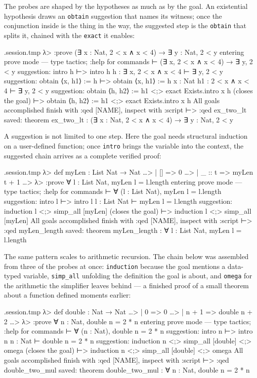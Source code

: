 \documentclass[11pt,oneside]{article}
\newcommand{\code}[1]{\texttt{#1}}
\newenvironment{session}
 {\VerbatimEnvironment\begin{VerbatimOut}{\jobname.session.tmp}}
 {\end{VerbatimOut}%
  \begin{sessionouter}%
  \VerbatimInput[fontsize=\footnotesize, breaklines=true,
    breaksymbolleft={\textcolor{stone}{\footnotesize$\hookrightarrow$}},
    formatcom=\color{ink}, tabsize=4]{\jobname.session.tmp}%
  \end{sessionouter}}
\begin{document}
The probes are shaped by the hypotheses as much as by the goal.  An
existential hypothesis draws an \code{obtain} suggestion that names
its witness; once the conjunction inside is the thing in the way, the
suggested step is the \code{obtain} that splits it, chained with the
\code{exact} it enables:

\begin{session}
λ> :prove (∃ x : Nat, 2 < x ∧ x < 4) → ∃ y : Nat, 2 < y
entering prove mode — type tactics; :help for commands
⊢ (∃ x, 2 < x ∧ x < 4) → ∃ y, 2 < y
suggestion: intro h
⊢> intro h
h : ∃ x, 2 < x ∧ x < 4
⊢ ∃ y, 2 < y
suggestion: obtain ⟨x, h1⟩ := h
⊢> obtain ⟨x, h1⟩ := h
x : Nat
h1 : 2 < x ∧ x < 4
⊢ ∃ y, 2 < y
suggestion: obtain ⟨h, h2⟩ := h1 <;> exact Exists.intro x h  (closes the goal)
⊢> obtain ⟨h, h2⟩ := h1 <;> exact Exists.intro x h
All goals accomplished
finish with :qed [NAME], inspect with :script
⊢> :qed ex_two_lt
saved: theorem ex_two_lt : (∃ x : Nat, 2 < x ∧ x < 4) → ∃ y : Nat, 2 < y
\end{session}

A suggestion is not limited to one step.  Here the goal needs
structural induction on a user-defined function; once \code{intro}
brings the variable into the context, the suggested chain arrives as a
complete verified proof:

\begin{session}
λ> def myLen : List Nat → Nat
…>   | [] => 0
…>   | _ :: t => myLen t + 1
…>
λ> :prove ∀ l : List Nat, myLen l = l.length
entering prove mode — type tactics; :help for commands
⊢ ∀ (l : List Nat), myLen l = l.length
suggestion: intro l
⊢> intro l
l : List Nat
⊢ myLen l = l.length
suggestion: induction l <;> simp_all [myLen]  (closes the goal)
⊢> induction l <;> simp_all [myLen]
All goals accomplished
finish with :qed [NAME], inspect with :script
⊢> :qed myLen_length
saved: theorem myLen_length : ∀ l : List Nat, myLen l = l.length
\end{session}

The same pattern scales to arithmetic recursion.  The chain below was
assembled from three of the probes at once: \code{induction} because
the goal mentions a data-typed variable, \code{simp\_all} unfolding
the definition the goal is about, and \code{omega} for the arithmetic
the simplifier leaves behind --- a finished proof of a small theorem
about a function defined moments earlier:

\begin{session}
λ> def double : Nat → Nat
…>   | 0 => 0
…>   | n + 1 => double n + 2
…>
λ> :prove ∀ n : Nat, double n = 2 * n
entering prove mode — type tactics; :help for commands
⊢ ∀ (n : Nat), double n = 2 * n
suggestion: intro n
⊢> intro n
n : Nat
⊢ double n = 2 * n
suggestion: induction n <;> simp_all [double] <;> omega  (closes the goal)
⊢> induction n <;> simp_all [double] <;> omega
All goals accomplished
finish with :qed [NAME], inspect with :script
⊢> :qed double_two_mul
saved: theorem double_two_mul : ∀ n : Nat, double n = 2 * n
\end{session}
\end{document}
